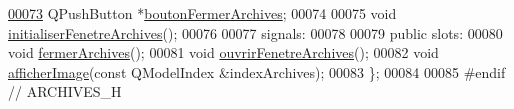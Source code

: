 \begin{DoxyCode}
\hyperlink{class_archives_a598e607e203aee9386f85d55f20d8fda}{00073}     QPushButton *\hyperlink{class_archives_a598e607e203aee9386f85d55f20d8fda}{boutonFermerArchives}; 
00074 
00075     \textcolor{keywordtype}{void} \hyperlink{class_archives_a1842ebad3721929949bc07be5144b79c}{initialiserFenetreArchives}();
00076 
00077 signals:
00078 
00079 \textcolor{keyword}{public} slots:
00080     \textcolor{keywordtype}{void} \hyperlink{class_archives_a0001d8b6a783f1f424965832e89a1f6f}{fermerArchives}();
00081     \textcolor{keywordtype}{void} \hyperlink{class_archives_a14d4f834ea05cf421161336607b4bb31}{ouvrirFenetreArchives}();
00082     \textcolor{keywordtype}{void} \hyperlink{class_archives_a0e12a12774643d96831be4daba73976e}{afficherImage}(\textcolor{keyword}{const} QModelIndex &indexArchives);
00083 \};
00084 
00085 \textcolor{preprocessor}{#endif // ARCHIVES\_H}
\end{DoxyCode}
